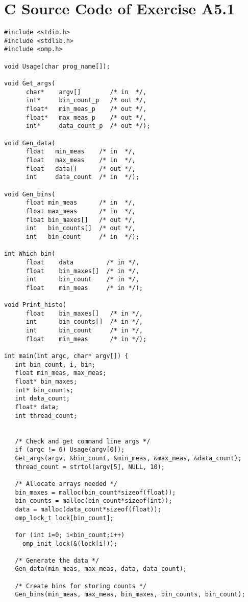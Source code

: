 \documentclass[a4paper,11pt,twoside]{article}
\begin{document}
\section{C Source Code of Exercise A5.1}{\label{app:histogram}}
\begin{verbatim}
#include <stdio.h>
#include <stdlib.h>
#include <omp.h>

void Usage(char prog_name[]);

void Get_args(
      char*    argv[]        /* in  */,
      int*     bin_count_p   /* out */,
      float*   min_meas_p    /* out */,
      float*   max_meas_p    /* out */,
      int*     data_count_p  /* out */);

void Gen_data(
      float   min_meas    /* in  */, 
      float   max_meas    /* in  */, 
      float   data[]      /* out */,
      int     data_count  /* in  */);

void Gen_bins(
      float min_meas      /* in  */, 
      float max_meas      /* in  */, 
      float bin_maxes[]   /* out */, 
      int   bin_counts[]  /* out */, 
      int   bin_count     /* in  */);

int Which_bin(
      float    data         /* in */, 
      float    bin_maxes[]  /* in */, 
      int      bin_count    /* in */, 
      float    min_meas     /* in */);

void Print_histo(
      float    bin_maxes[]   /* in */, 
      int      bin_counts[]  /* in */, 
      int      bin_count     /* in */, 
      float    min_meas      /* in */);

int main(int argc, char* argv[]) {
   int bin_count, i, bin;
   float min_meas, max_meas;
   float* bin_maxes;
   int* bin_counts;
   int data_count;
   float* data;
   int thread_count;
   

   /* Check and get command line args */
   if (argc != 6) Usage(argv[0]); 
   Get_args(argv, &bin_count, &min_meas, &max_meas, &data_count);
   thread_count = strtol(argv[5], NULL, 10);

   /* Allocate arrays needed */
   bin_maxes = malloc(bin_count*sizeof(float));
   bin_counts = malloc(bin_count*sizeof(int));
   data = malloc(data_count*sizeof(float));
   omp_lock_t lock[bin_count];

   for (int i=0; i<bin_count;i++)
     omp_init_lock(&(lock[i]));

   /* Generate the data */
   Gen_data(min_meas, max_meas, data, data_count);

   /* Create bins for storing counts */
   Gen_bins(min_meas, max_meas, bin_maxes, bin_counts, bin_count);


\end{verbatim}
\end{document}
